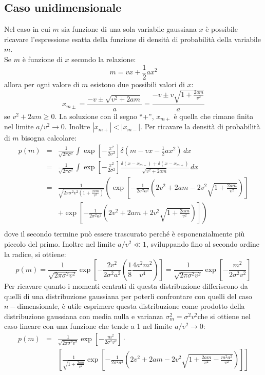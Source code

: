 \subsection{Caso unidimensionale}
Nel caso in cui $m$ sia funzione di una sola variabile gaussiana $x$ \`e possibile
ricavare l'espressione esatta della funzione di densit\`a di probabilit\`a della
variabile $m$.\\Se $m$ \`e funzione di $x$ secondo la relazione:
\[m=vx+\frac{1}{2}ax^2\]
allora per ogni valore di $m$ esistono due possibili valori di $x$:
\[x_{m\pm}=\frac{-v\pm\sqrt{v^2+2am}}{a}=\frac{-v\pm v\sqrt{1+\frac{2am}{v^2}}}{a}\]
se $v^2+2am\geq 0$. La soluzione con il segno ``+'', $x_{m+}$ \`e quella che rimane finita nel limite $a/v^2\rightarrow 0$. Inoltre $|x_{m+}|<|x_{m-}|$. Per ricavare la densit\`a di probabilit\`a di $m$ bisogna calcolare:
\begin{eqnarray*}
p(m)&=&\frac{1}{\sqrt{2\pi\sigma^2}}\int \exp\left[-\frac{x^2}{2\sigma^2}\right]\delta\left(m-vx-\frac{1}{2}ax^2\right)\,dx\\
&=&\frac{1}{\sqrt{2\pi\sigma^2}}\int \exp\left[-\frac{x^2}{2\sigma^2}\right]\frac{\delta(x-x_{m-})+\delta(x-x_{m+})}{\sqrt{v^2+2am}}\,dx\\
&=&\frac{1}{\sqrt{2\pi\sigma^2v^2(1+\frac{2am}{v^2})}}\left(\exp\left[-\frac{1}{2\sigma^2 a^2}\left(2v^2+2am-2v^2\sqrt{1+\frac{2am}{v^2}}\right)\right]\right.\\
&&+\left.\exp\left[-\frac{1}{2\sigma^2 a^2}\left(2v^2+2am+2v^2\sqrt{1+\frac{2am}{v^2}}\right)\right]\right)\\
\end{eqnarray*}
dove il secondo termine pu\`o essere trascurato perch\'e \`e esponenzialmente pi\`u piccolo del primo. Inoltre nel limite $a/v^2\ll 1$, sviluppando fino al secondo
ordine la radice, si ottiene:
\[p(m)=\frac{1}{\sqrt{2\pi\sigma^2v^2}}\exp\left[-\frac{2v^2}{2\sigma^2 a^2}\left(\frac{1}{8}\frac{4a^2m^2}{v^4}\right)\right]=\frac{1}{\sqrt{2\pi\sigma^2v^2}}\exp\left[-\frac{m^2}{2\sigma^2 v^2}\right]\]
Per ricavare quanto i momenti centrati di questa distribuzione differiscono da quelli di una distribuzione gaussiana per poterli confrontare con quelli del caso $n-$dimensionale, \`e utile esprimere questa distribuzione come prodotto
della distribuzione gaussiana con media nulla e varianza $\sigma^2_m=\sigma^2 v^2$che si ottiene nel caso lineare con una funzione che tende a 1 nel limite
$a/v^2\rightarrow 0$:
\begin{eqnarray*}
p(m)&=&\frac{1}{\sqrt{2\pi\sigma^2v^2}}\exp\left[-\frac{m^2}{2\sigma^2v^2}\right]\cdot\\
&&\left[\frac{1}{\sqrt{1+\frac{2am}{v^2}}}\exp\left[-\frac{1}{2\sigma^2a^2}\left(2v^2+2am-2v^2\sqrt{1+\frac{2am}{v^2}-\frac{m^2a^2}{v^2}}\right)\right]\right]\\\end{eqnarray*}
